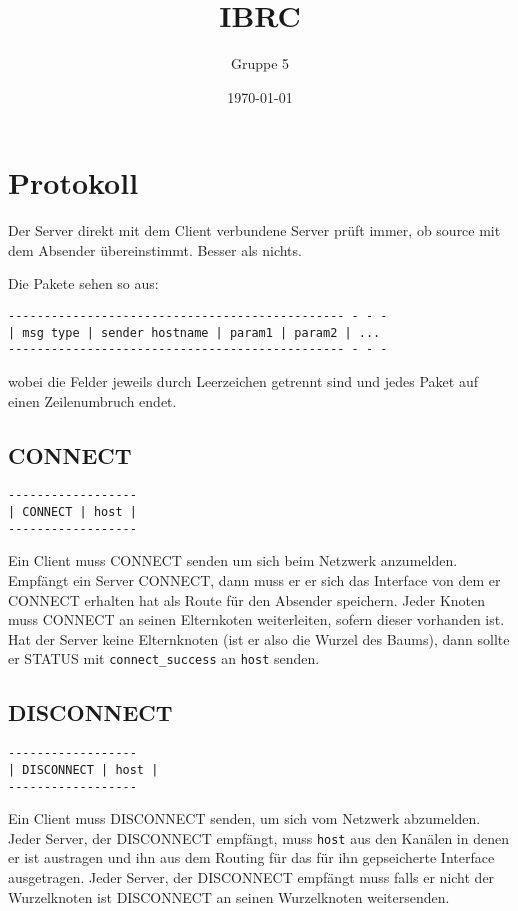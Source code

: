 \documentclass{article}
\title{IBRC}
\author{Gruppe 5}
\date{\today}
\begin{document}
\maketitle

\section{Protokoll}

Der Server direkt mit dem Client verbundene Server prüft immer, ob source mit dem Absender übereinstimmt. Besser als nichts. 

Die Pakete sehen so aus:
\begin{lstlisting}
----------------------------------------------- - - -
| msg type | sender hostname | param1 | param2 | ...
----------------------------------------------- - - -
\end{lstlisting}
wobei die Felder jeweils durch Leerzeichen getrennt sind und jedes Paket auf einen Zeilenumbruch endet.

\subsection{CONNECT}

\begin{lstlisting}
------------------
| CONNECT | host |
------------------
\end{lstlisting}

Ein Client muss CONNECT senden um sich beim Netzwerk anzumelden. Empfängt ein Server CONNECT, dann muss er er sich das Interface von dem er CONNECT erhalten hat als Route für den Absender speichern. Jeder Knoten muss CONNECT an seinen Elternkoten weiterleiten, sofern dieser vorhanden ist. Hat der Server keine Elternknoten (ist er also die Wurzel des Baums), dann sollte er STATUS mit \lstinline{connect_success} an \lstinline{host} senden.

\subsection{DISCONNECT}

\begin{lstlisting}
------------------
| DISCONNECT | host |
------------------
\end{lstlisting}

Ein Client muss DISCONNECT senden, um sich vom Netzwerk abzumelden.
Jeder Server, der DISCONNECT empfängt, muss \lstinline{host} aus den Kanälen in denen er ist austragen und ihn aus dem Routing für das für ihn gepseicherte Interface ausgetragen.
Jeder Server, der DISCONNECT empfängt muss falls er nicht der Wurzelknoten ist DISCONNECT an seinen Wurzelknoten weitersenden.
\end{document}

